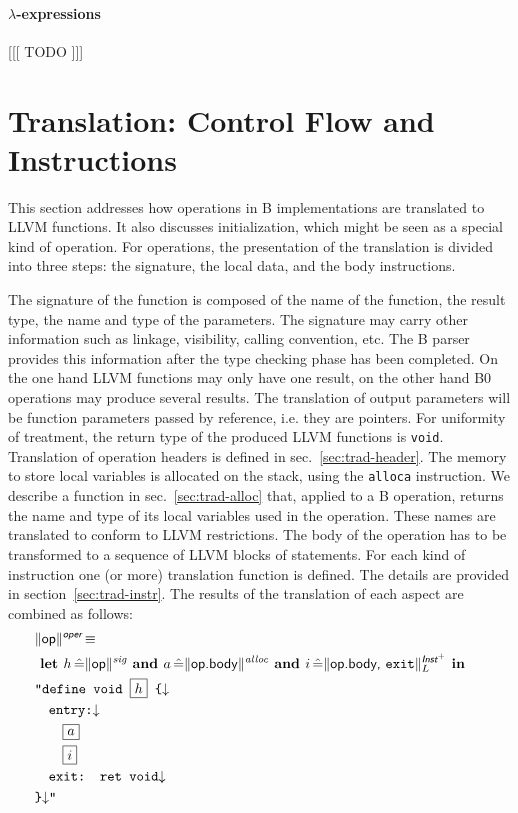 \documentclass{llncs}
\newcommand{\trad}[2]{\ensuremath{\lVert \textsf{#1} \rVert^{\textit{#2}}}}
\newcommand{\nl}[0]{\ensuremath{\downarrow}}
\DeclareMathOperator{\isdef}{\equiv}
\newcommand{\llvm}[1]{\texttt{#1}}
\newcommand{\B}[1]{\textsf{#1}}
\newcommand{\ListOf}[1]{$\mbox{#1}^+$}
\newcommand{\LET}[0]{\textbf{ let }}
\DeclareMathOperator{\BE}{\hat{=}}
\newcommand{\IN}[0]{\textbf{ in }}
\newcommand{\AND}[0]{\textbf{ and }}
\newcommand{\PH}[1]{\framebox{$#1$}}
\begin{document}
\paragraph{$\lambda$-expressions}

[[[ TODO ]]]




\section{Translation: Control Flow and Instructions
\label{sec:control}}

This section addresses how operations in B implementations are translated to
LLVM functions. It also discusses initialization, which might be seen as a
special kind of operation. For operations, the presentation of the translation
is divided into three steps: the signature, the local data, and the body
instructions.

The signature of the function is composed of the name of the function, the
result type, the name and type of the parameters. The signature may carry other
information such as linkage, visibility, calling convention, etc. The B parser
provides this information after the type checking phase has been completed.  On
the one hand LLVM functions may only have one result, on the other hand B0
operations may produce several results. The translation of output parameters
will be function parameters passed by reference, i.e. they are pointers. For
uniformity of treatment, the return type of the produced LLVM functions is
\llvm{void}. Translation of operation headers is defined in
sec.~\ref{sec:trad-header}. The memory to store local variables is allocated on
the stack, using the \llvm{alloca} instruction. We describe a function in
sec.~\ref{sec:trad-alloc} that, applied to a B operation, returns the name and
type of its local variables used in the operation. These names are translated to
conform to LLVM restrictions. The body of the operation has to be transformed to
a sequence of LLVM blocks of statements. For each kind of instruction one (or
more) translation function is defined. The details are provided in
section~\ref{sec:trad-instr}.  The results of the translation of each aspect are
combined as follows:
\begin{align*}
\begin{split}
  \lefteqn{\trad{\B{op}}{\B{oper}} \isdef} \\
  & \LET h \BE \trad{\B{op}}{sig} \AND   a \BE \trad{\B{op.body}}{alloc} \AND i \BE \trad{\B{op.body}, \llvm{exit}}{\ListOf{\B{Inst}}}_L \IN  \\
  & \llvm{"define void \PH{h} \{\nl} \\
  & \quad \llvm{entry:\nl} \\
  & \quad \quad \PH{a} \\
  & \quad \quad \PH{i} \\
  & \quad \llvm{exit: ret void\nl} \\
  & \llvm{\}\nl"}
\end{split}
\end{align*}
\end{document}
